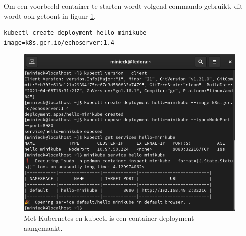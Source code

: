 Om een voorbeeld container te starten wordt volgend commando gebruikt, dit wordt ook getoont in figuur \ref{fig:hellokube}.
\begin{verbatim}
kubectl create deployment hello-minikube --image=k8s.gcr.io/echoserver:1.4
\end{verbatim}
\begin{figure}[h]
    \includegraphics[width=\linewidth]{img/hellokube.png}
    \caption[Het opstarten van een container met kubectl]{Met Kubernetes en kubectl is een container deployment aangemaakt.}
    \label{fig:hellokube}
    \centering
\end{figure}

